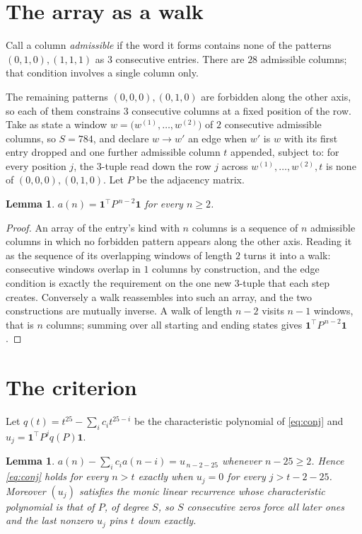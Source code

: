 \documentclass[11pt,a4paper]{article}
\theoremstyle{plain}
\newtheorem{lemma}[theorem]{Lemma}
\theoremstyle{definition}
\begin{document}
\section{The array as a walk}

Call a column \emph{admissible} if the word it forms contains none of the patterns
$(0,1,0), (1,1,1)$ as $3$ consecutive entries. There are $28$ admissible columns; that condition
involves a single column only.

The remaining patterns $(0,0,0), (0,1,0)$ are forbidden along the other axis, so each of them
constrains $3$ consecutive columns at a fixed position of the row. Take as state a
window $w=\bigl(w^{(1)},\dots,w^{(2)}\bigr)$ of $2$ consecutive admissible
columns, so $S=784$, and declare $w\to w'$ an edge when $w'$ is $w$ with its first entry
dropped and one further admissible column $t$ appended, subject to: for every position
$j$, the $3$-tuple read down the row $j$ across $w^{(1)},\dots,w^{(2)},t$
is none of $(0,0,0), (0,1,0)$. Let $P$ be the adjacency matrix.

\begin{lemma}\label{lem:walk}
$a(n)=\mathbf{1}^{\!\top}P^{\,n-2}\mathbf{1}$ for every $n\ge2$.
\end{lemma}

\begin{proof}
An array of the entry's kind with $n$ columns is a sequence of $n$ admissible columns in
which no forbidden pattern appears along the other axis. Reading it as the sequence of its
overlapping windows of length $2$ turns it into a walk: consecutive windows overlap in
$1$ columns by construction, and the edge condition is exactly the requirement on the one
new $3$-tuple that each step creates. Conversely a walk reassembles into such an array,
and the two constructions are mutually inverse. A walk of length $n-2$ visits $n-1$
windows, that is $n$ columns; summing over all starting and ending states gives
$\mathbf{1}^{\!\top}P^{\,n-2}\mathbf{1}$.
\end{proof}

\section{The criterion}

Let $q(t)=t^{25}-\sum_i c_i t^{25-i}$ be the characteristic polynomial of
\eqref{eq:conj} and $u_j=\mathbf{1}^{\!\top}P^{j}q(P)\mathbf{1}$.

\begin{lemma}\label{lem:crit}
$a(n)-\sum_i c_i a(n-i)=u_{\,n-2-25}$ whenever $n-25\ge2$. Hence
\eqref{eq:conj} holds for every $n>t$ exactly when $u_j=0$ for every
$j>t-2-25$. Moreover $(u_j)$ satisfies the monic linear recurrence whose
characteristic polynomial is that of $P$, of degree $S$, so $S$ consecutive zeros force all
later ones and the last nonzero $u_j$ pins $t$ down exactly.
\end{lemma}
\end{document}
